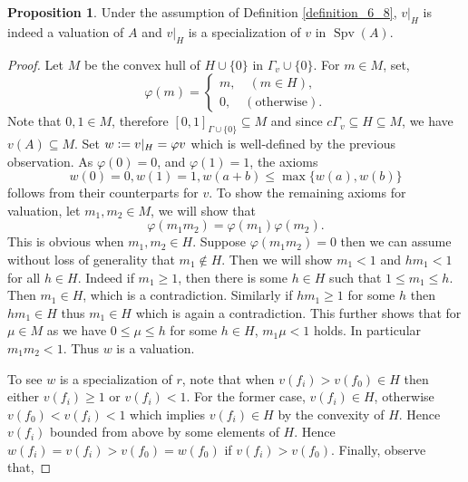 \documentclass[10pt]{article}
\numberwithin{equation}{section}
\theoremstyle{definition}
\newtheorem{proposition}{Proposition}[subsection]
\DeclareMathOperator{\Spv}{Spv}
\newcommand{\defeq}{\vcentcolon=}
\newcommand{\cGamma}[0]{c\Gamma}
\begin{document}
\begin{proposition}
    \label{fact_7_8}
    Under the assumption of Definition \ref{definition_6_8}, $v|_H$ is indeed a valuation of $A$ and $v|_H$ is a specialization of $v$ in $\Spv(A)$.
\end{proposition}
\begin{proof}
    Let $M$ be the convex hull of $ H\cup\{0\}$ in $\Gamma_v\cup\{0\}$. For $m\in M$, set,
    \begin{equation*}
        \varphi(m) =\begin{cases}
            m,\quad(m\in H),\\
            0,\quad (\text{otherwise}).
        \end{cases}
    \end{equation*}
    Note that $0,1\in M$, therefore $[0,1]_{\Gamma\cup\{0\}}\subseteq M$ and since $\cGamma_v\subseteq H\subseteq M$, we have $v(A)\subseteq M$.
    Set $w\defeq v|_H = \varphi v$ which is well-defined by the previous observation.
    As $\varphi(0) = 0$, and $\varphi(1) = 1$, the axioms
    \begin{equation*}
        w(0) = 0,w(1) = 1,w(a+b)\leq\max\{w(a),w(b)\}
    \end{equation*}
    follows from their counterparts for $v$. To show the remaining axioms for valuation, let $m_1,m_2\in M$, we will show that
    \begin{equation*}
    \varphi(m_1m_2) = \varphi(m_1)\varphi(m_2).
    \end{equation*}
    This is obvious when $m_1,m_2\in H$. Suppose $\varphi(m_1m_2)=0$ then we can assume without loss of generality that $m_1\not\in H$. Then we will show $m_1<1$ and $hm_1<1$ for all $h\in H$. Indeed if $m_1\geq 1$, then there is some $h\in H$ such that $1\leq m_1\leq h$. Then $m_1\in H$, which is a contradiction. Similarly if $hm_1\geq 1$ for some $h$ then $hm_1\in H$ thus $m_1\in H$ which is again a contradiction. This further shows that for $\mu\in M$ as we have $0\leq \mu\leq h$ for some $h\in H$, $m_1\mu<1$ holds. In particular $m_1m_2<1$. Thus $w$ is a valuation.
    \par To see $w$ is a specialization of $r$, note that when $v(f_i)>v(f_0)\in H$ then either $v(f_i)\geq 1$ or $v(f_i)<1$. For the former case, $v(f_i)\in H$, otherwise $v(f_0)<v(f_i)<1$ which implies $v(f_i)\in H$ by the convexity of $H$. Hence $v(f_i)$ bounded from above by some elements of $H$. Hence $w(f_i)=v(f_i)>v(f_0) = w(f_0)$ if $v(f_i)>v(f_0)$. Finally, observe that,

\end{proof}
\end{document}
